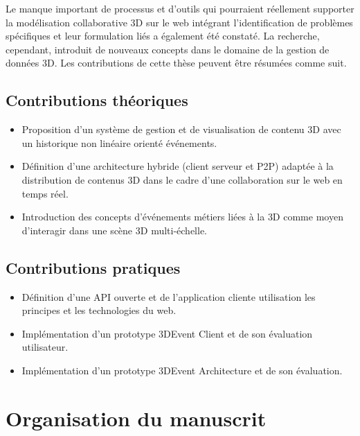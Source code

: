 Le manque important de processus et d'outils qui pourraient réellement supporter la modélisation collaborative \gls{3D} sur le web intégrant l'identification de problèmes spécifiques et leur formulation liés a également été constaté. 
La recherche, cependant, introduit de nouveaux concepts dans le domaine de la gestion de 
données \gls{3D}. Les contributions de cette thèse peuvent être résumées comme 
suit.


\subsection{Contributions théoriques}

\begin{itemize}
	\item {}Proposition d'un système de 
	gestion et de visualisation de contenu \gls{3D} avec un historique non linéaire 
	orienté événements.
	\item Définition d'une architecture hybride (client serveur et \gls{P2P}) adaptée à 
	la distribution de contenus \gls{3D} dans le cadre d'une collaboration sur le web en 
	temps réel.
	\item Introduction des concepts d'événements métiers liées à la \gls{3D} 
	comme moyen d'interagir dans une scène \gls{3D} multi-échelle.
\end{itemize}
\subsection{Contributions pratiques}
\begin{itemize}
	\item {}Définition d'une API ouverte et 
	de l'application cliente utilisation les principes et les technologies du web.
	\item Implémentation d'un prototype 3DEvent Client et de son évaluation 
	utilisateur. 
	\item Implémentation d'un prototype 3DEvent Architecture et de son évaluation.
	
\end{itemize}


\section{Organisation du manuscrit}

